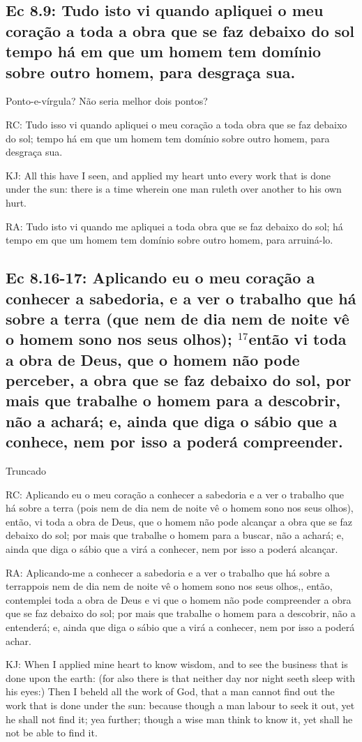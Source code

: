 \subsection{Ec 8.9: Tudo isto vi quando apliquei o meu coração a toda a obra que se faz debaixo do sol\uwave{;} tempo há em que um homem tem domínio sobre outro homem, para desgraça sua.}
Ponto-e-vírgula? Não seria melhor dois pontos?

RC: Tudo isso vi quando apliquei o meu coração a toda obra que se faz debaixo do sol; tempo há em que um homem tem domínio sobre outro homem, para desgraça sua.

KJ: All this have I seen, and applied my heart unto every work that is done under the sun: there is a time wherein one man ruleth over another to his own hurt.

RA: Tudo isto vi quando me apliquei a toda obra que se faz debaixo do sol; há tempo em que um homem tem domínio sobre outro homem, para arruiná-lo.

\subsection{Ec 8.16-17: Aplicando eu o meu coração a conhecer a sabedoria, e a ver o trabalho que há sobre a terra (que nem de dia nem de noite vê o homem sono nos seus olhos); $^{\mathrm{17}}$então vi toda a obra de Deus, que o homem não pode perceber, a obra que se faz debaixo do sol, por mais que trabalhe o homem para a descobrir, não a achará; e, ainda que diga o sábio que a conhece, nem por isso a poderá compreender.}

Truncado

RC: Aplicando eu o meu coração a conhecer a sabedoria e a ver o trabalho que há sobre a terra (pois nem de dia nem de noite vê o homem sono nos seus olhos), então, vi toda a obra de Deus, que o homem não pode alcançar a obra que se faz debaixo do sol; por mais que trabalhe o homem para a buscar, não a achará; e, ainda que diga o sábio que a virá a conhecer, nem por isso a poderá alcançar.

RA: Aplicando-me a conhecer a sabedoria e a ver o trabalho que há sobre a terrappois nem de dia nem de noite vê o homem sono nos seus olhos,, então, contemplei toda a obra de Deus e vi que o homem não pode compreender a obra que se faz debaixo do sol; por mais que trabalhe o homem para a descobrir, não a entenderá; e, ainda que diga o sábio que a virá a conhecer, nem por isso a poderá achar.

KJ: When I applied mine heart to know wisdom, and to see the business that is done upon the earth: (for also there is that neither day nor night seeth sleep with his eyes:) Then I beheld all the work of God, that a man cannot find out the work that is done under the sun: because though a man labour to seek it out, yet he shall not find it; yea further; though a wise man think to know it, yet shall he not be able to find it.

